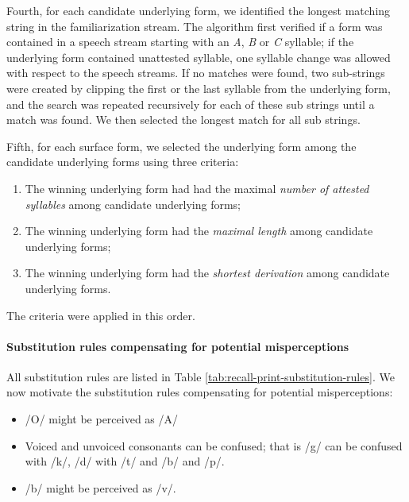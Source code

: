 \documentclass[
]{article}
\providecommand{\tightlist}{%
  \setlength{\itemsep}{0pt}\setlength{\parskip}{0pt}}
\begin{document}
Fourth, for each candidate underlying form, we identified the longest
matching string in the familiarization stream. The algorithm first
verified if a form was contained in a speech stream starting with an
\emph{A}, \emph{B} or \emph{C} syllable; if the underlying form
contained unattested syllable, one syllable change was allowed with
respect to the speech streams. If no matches were found, two sub-strings
were created by clipping the first or the last syllable from the
underlying form, and the search was repeated recursively for each of
these sub strings until a match was found. We then selected the longest
match for all sub strings.

Fifth, for each surface form, we selected the underlying form among the
candidate underlying forms using three criteria:

\begin{enumerate}
\def\labelenumi{\arabic{enumi}.}
\tightlist
\item
  The winning underlying form had had the maximal \emph{number of
  attested syllables} among candidate underlying forms;
\item
  The winning underlying form had the \emph{maximal length} among
  candidate underlying forms;
\item
  The winning underlying form had the \emph{shortest derivation} among
  candidate underlying forms.
\end{enumerate}

The criteria were applied in this order.

\hypertarget{substitution-rules-compensating-for-potential-misperceptions}{%
\paragraph{Substitution rules compensating for potential
misperceptions}\label{substitution-rules-compensating-for-potential-misperceptions}}

All substitution rules are listed in Table
\ref{tab:recall-print-substitution-rules}. We now motivate the
substitution rules compensating for potential misperceptions:

\begin{itemize}
\tightlist
\item
  /O/ might be perceived as /A/
\item
  Voiced and unvoiced consonants can be confused; that is /g/ can be
  confused with /k/, /d/ with /t/ and /b/ and /p/.
\item
  /b/ might be perceived as /v/.
\end{itemize}
\end{document}
